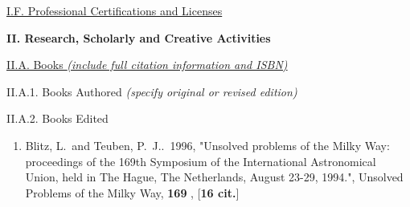 \documentclass[11pt,letterpaper]{article}
\begin{document}
\underline{I.F. Professional Certifications and Licenses}


\textbf{II. Research, Scholarly and Creative Activities}

% 

\noindent\underline{II.A. Books \textit{(include full citation information and ISBN)}}

II.A.1. Books Authored \textit{(specify original or revised edition)}

II.A.2. Books Edited

\begin{enumerate}[resume,label=\textbf{\arabic*}.]


\item  
Blitz, L.~and Teuben, P.~J..\  1996,  "Unsolved problems of the Milky Way: 
proceedings of the 169th Symposium of the International Astronomical Union, 
held in The Hague, The Netherlands, August 23-29, 1994.", Unsolved Problems 
of the Milky Way,  {\bf 169} ,  [{\bf 16 cit.}] 


\end{enumerate}
\end{document}
